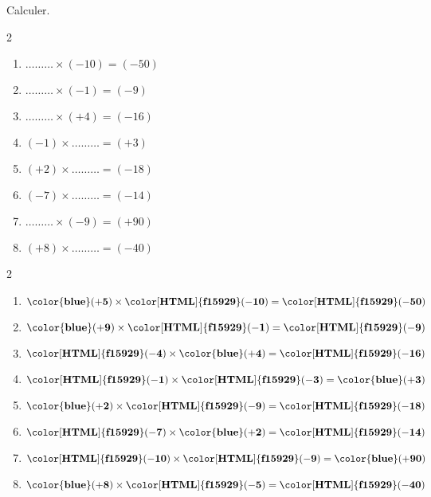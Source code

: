 \begin{exercice*}
    Calculer.
    \begin{multicols}2
        \begin{enumerate}
            \item $ \ldots\ldots\ldots \times (-10) = (-50) $
            \item $ \ldots\ldots\ldots \times (-1) = (-9) $
            \item $ \ldots\ldots\ldots \times (+4) = (-16) $
            \item $ (-1) \times \ldots\ldots\ldots = (+3) $
            \item $ (+2) \times \ldots\ldots\ldots = (-18) $
            \item $ (-7) \times \ldots\ldots\ldots = (-14) $
            \item $ \ldots\ldots\ldots \times (-9) = (+90) $
            \item $ (+8) \times \ldots\ldots\ldots = (-40) $
        \end{enumerate}
    \end{multicols}
\end{exercice*}
\begin{corrige}
    \phantom{rrr}    
    \begin{multicols}2
        \begin{enumerate}
            \item $ \mathbf{{\color{blue}(+5)}} \times \mathbf{{\color[HTML]{f15929}(-10)}} = \mathbf{{\color[HTML]{f15929}(-50)}} $
            \item $ \mathbf{{\color{blue}(+9)}} \times \mathbf{{\color[HTML]{f15929}(-1)}} = \mathbf{{\color[HTML]{f15929}(-9)}} $
            \item $ \mathbf{{\color[HTML]{f15929}(-4)}} \times \mathbf{{\color{blue}(+4)}} = \mathbf{{\color[HTML]{f15929}(-16)}} $
            \item $ \mathbf{{\color[HTML]{f15929}(-1)}} \times \mathbf{{\color[HTML]{f15929}(-3)}} = \mathbf{{\color{blue}(+3)}} $
            \item $ \mathbf{{\color{blue}(+2)}} \times \mathbf{{\color[HTML]{f15929}(-9)}} = \mathbf{{\color[HTML]{f15929}(-18)}} $
            \item $ \mathbf{{\color[HTML]{f15929}(-7)}} \times \mathbf{{\color{blue}(+2)}} = \mathbf{{\color[HTML]{f15929}(-14)}} $
            \item $ \mathbf{{\color[HTML]{f15929}(-10)}} \times \mathbf{{\color[HTML]{f15929}(-9)}} = \mathbf{{\color{blue}(+90)}} $
            \item $ \mathbf{{\color{blue}(+8)}} \times \mathbf{{\color[HTML]{f15929}(-5)}} = \mathbf{{\color[HTML]{f15929}(-40)}} $      
        \end{enumerate}
    \end{multicols}
\end{corrige}